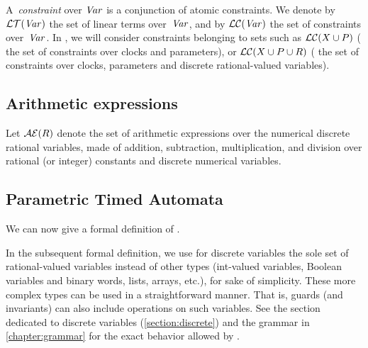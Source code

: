 A~\emph{constraint} over $\mathit{Var}$ is a conjunction of atomic constraints.
We denote by $\mathcal{LT}(\mathit{Var})$ the set of linear terms over~$\mathit{Var}$, and by $\mathcal{LC}(\mathit{Var})$ the set of constraints over~$\mathit{Var}$.
In \imitator{}, we will consider constraints belonging to sets such as $\mathcal{LC}(X \cup P)$ (\ie{} the set of constraints over clocks and parameters), or $\mathcal{LC}(X \cup P \cup R)$ (\ie{} the set of constraints over clocks, parameters and discrete rational-valued variables).



\subsection{Arithmetic expressions}

Let $\mathcal{AE}(R)$ denote the set of arithmetic expressions over the numerical discrete rational variables, \ie{} made of addition, subtraction, multiplication, and division over rational (or integer) constants and discrete numerical variables.



\subsection{\imitator{} Parametric Timed Automata}


We can now give a formal definition of \IPTA{}.

\begin{remark}
	In the subsequent formal definition, we use for discrete variables the sole set of rational-valued variables instead of other types (int-valued variables, Boolean variables and binary words, lists, arrays, etc.), for sake of simplicity.
	These more complex types can be used in a straightforward manner.
	That is, guards (and invariants) can also include operations on such variables.
	See the section dedicated to discrete variables (\cref{section:discrete}) and the grammar in \cref{chapter:grammar} for the exact behavior allowed by \imitator{}.
\end{remark}

